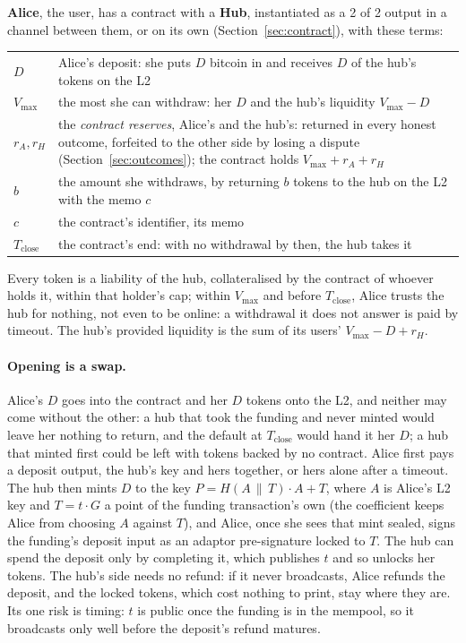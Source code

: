 \documentclass[11pt]{article}
\newcommand{\vmax}{V_{\max}}
\newcommand{\Tc}{T_{\mathrm{close}}}
\begin{document}
\textbf{Alice}, the user, has a contract with a \textbf{Hub}, instantiated as a 2 of 2 output in a channel between them, or
on its own (Section~\ref{sec:contract}), with these terms:
\begin{center}
\small
\begin{tabularx}{\linewidth}{p{16mm}L}
\toprule
$D$ & Alice's deposit: she puts $D$ bitcoin in and receives $D$ of the hub's tokens on the L2 \\
$\vmax$ & the most she can withdraw: her $D$ and the hub's liquidity $\vmax - D$ \\
$r_A, r_H$ & the \emph{contract reserves}, Alice's and the hub's: returned in every honest outcome, forfeited to the other side by losing a dispute (Section~\ref{sec:outcomes}); the contract holds $\vmax + r_A + r_H$ \\
$b$ & the amount she withdraws, by returning $b$ tokens to the hub on the L2 with the memo $c$ \\
$c$ & the contract's identifier, its memo \\
$\Tc$ & the contract's end: with no withdrawal by then, the hub takes it \\
\bottomrule
\end{tabularx}
\end{center}
Every token is a liability of the hub, collateralised by the contract of whoever holds it, within that holder's cap; within $\vmax$ and before $\Tc$, Alice trusts the hub for nothing, not even to be online: a withdrawal it does not answer is paid by timeout. The hub's provided liquidity is the sum of its users'
$\vmax - D + r_H$.

\paragraph{Opening is a swap.} Alice's $D$ goes into the contract and her
$D$ tokens onto the L2, and neither may come without the other: a hub
that took the funding and never minted would leave her nothing to
return, and the default at $\Tc$ would hand it her $D$; a hub that
minted first could be left with tokens backed by no contract. Alice
first pays a deposit output, the hub's key and hers together, or hers
alone after a timeout. The hub then mints $D$ to the key
$P = H(A \,\|\, T)\cdot A + T$, where $A$ is Alice's L2 key and $T = t\cdot G$
a point of the funding transaction's own (the coefficient keeps Alice
from choosing $A$ against $T$), and Alice, once she sees that mint
sealed, signs the funding's deposit input as an adaptor pre-signature
locked to $T$. The hub can spend the deposit only by completing it,
which publishes $t$ and so unlocks her tokens. The hub's side needs no
refund: if it never broadcasts, Alice refunds the deposit, and the
locked tokens, which cost nothing to print, stay where they are. Its one
risk is timing: $t$ is public once the funding is in the mempool, so it
broadcasts only well before the deposit's refund matures.
\end{document}
